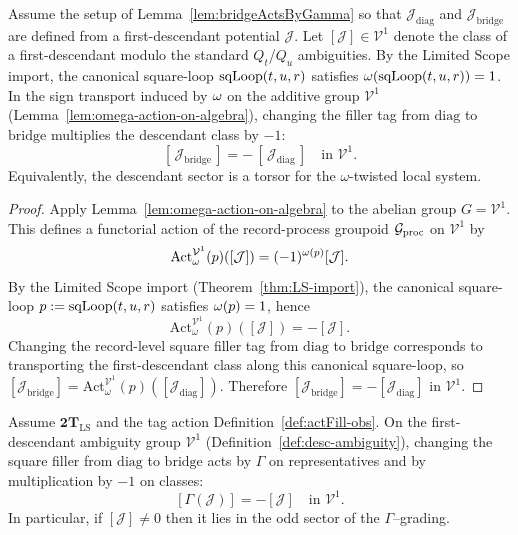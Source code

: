 \begin{lemma}
\label{lem:filler-descent-dictionary}
Assume the setup of Lemma~\ref{lem:bridgeActsByGamma} so that
$\mathcal J_{\mathrm{diag}}$ and $\mathcal J_{\mathrm{bridge}}$ are defined from
a first-descendant potential $\mathcal J$.
Let $[\mathcal J]\in\mathcal V^1$ denote the class of a first-descendant
modulo the standard $Q_t$/$Q_u$ ambiguities. By the Limited Scope import,
the canonical square-loop $\mathrm{sqLoop}(t,u,r)$ satisfies $\omega(\mathrm{sqLoop}(t,u,r))=1$.
In the sign transport induced by $\omega$ on the additive group $\mathcal V^1$
(Lemma~\ref{lem:omega-action-on-algebra}), changing the filler tag from
$\mathrm{diag}$ to $\mathrm{bridge}$ multiplies the descendant class by $-1$:
\[
[\,\mathcal J_{\mathrm{bridge}}\,]
=-\, [\,\mathcal J_{\mathrm{diag}}\,]
\quad\text{in }\mathcal V^1.
\]
Equivalently, the descendant sector is a torsor for the $\omega$-twisted local system.
\end{lemma}

\begin{proof}
Apply Lemma~\ref{lem:omega-action-on-algebra} to the abelian group
$G=\mathcal V^1$. This defines a functorial action of the record-process groupoid
$\mathcal G_{\mathrm{proc}}$ on $\mathcal V^1$ by
\[
\mathrm{Act}_\omega^{\mathcal V^1}(p)([\mathcal J])=(-1)^{\omega(p)}[\mathcal J].
\]
By the Limited Scope import (Theorem~\ref{thm:LS-import}), the canonical square-loop
$p:=\mathrm{sqLoop}(t,u,r)$ satisfies $\omega(p)=1$, hence
\[
\mathrm{Act}_\omega^{\mathcal V^1}(p)([\mathcal J])=-[\mathcal J].
\]
Changing the record-level square filler tag from $\mathrm{diag}$ to $\mathrm{bridge}$
corresponds to transporting the first-descendant class along this canonical square-loop,
so $[\mathcal J_{\mathrm{bridge}}]=\mathrm{Act}_\omega^{\mathcal V^1}(p)([\mathcal J_{\mathrm{diag}}])$.
Therefore $[\mathcal J_{\mathrm{bridge}}]=- [\mathcal J_{\mathrm{diag}}]$ in $\mathcal V^1$.
\end{proof}

\begin{lemma}
\label{lem:parity-transport}
Assume $\mathbf{2T}_{\mathrm{LS}}$ and the tag action
Definition~\ref{def:actFill-obs}.  On the first-descendant ambiguity group
$\mathcal V^1$ (Definition~\ref{def:desc-ambiguity}), changing the square filler
from $\mathrm{diag}$ to $\mathrm{bridge}$ acts by $\Gamma$ on representatives and
by multiplication by $-1$ on classes:
\[
[\Gamma(\mathcal J)]=-[\mathcal J]\quad\text{in }\mathcal V^1.
\]
In particular, if $[\mathcal J]\neq 0$ then it lies in the odd sector of
the $\Gamma$--grading.
\end{lemma}

